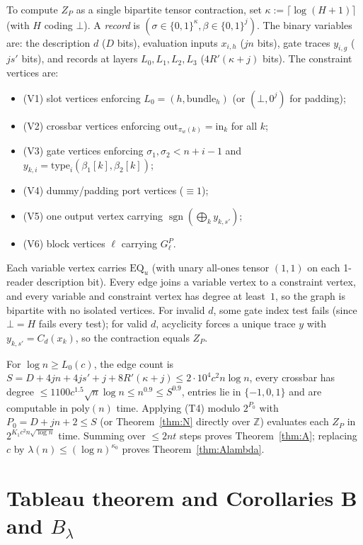 \documentclass[11pt]{article}
\theoremstyle{definition}
\begin{document}
To compute $Z_P$ as a single bipartite tensor contraction, set $\kappa:=\lceil\log(H+1)\rceil$ (with $H$ coding $\bot$). A \emph{record} is $(\sigma\in\{0,1\}^\kappa,\beta\in\{0,1\}^j)$. The binary variables are: the description $d$ ($D$ bits), evaluation inputs $x_{i,h}$ ($j n$ bits), gate traces $y_{i,g}$ ($j s'$ bits), and records at layers $L_0,L_1,L_2,L_3$ ($4R'(\kappa+j)$ bits). The constraint vertices are:
\begin{itemize}
\item (V1) slot vertices enforcing $L_0=(h,\mathrm{bundle}_h)$ (or $(\bot,0^j)$ for padding);
\item (V2) crossbar vertices enforcing $\mathrm{out}_{\pi_w(k)}=\mathrm{in}_k$ for all $k$;
\item (V3) gate vertices enforcing $\sigma_1,\sigma_2<n+i-1$ and $y_{k,i}=\mathrm{type}_i(\beta_1[k],\beta_2[k])$;
\item (V4) dummy/padding port vertices ($\equiv 1$);
\item (V5) one output vertex carrying $\operatorname{sgn}(\bigoplus_k y_{k,s'})$;
\item (V6) block vertices $\ell$ carrying $G_\ell^P$.
\end{itemize}
Each variable vertex carries $\mathrm{EQ}_u$ (with unary all-ones tensor $(1,1)$ on each 1-reader description bit). Every edge joins a variable vertex to a constraint vertex, and every variable and constraint vertex has degree at least~$1$, so the graph is bipartite with no isolated vertices. For invalid $d$, some gate index test fails (since $\bot=H$ fails every test); for valid $d$, acyclicity forces a unique trace $y$ with $y_{k,s'}=C_d(x_k)$, so the contraction equals $Z_P$.

For $\log n\ge L_0(c)$, the edge count is $S=D+4jn+4js'+j+8R'(\kappa+j)\le 2\cdot10^4 c^2 n\log n$, every crossbar has degree $\le 1100 c^{1.5}\sqrt{n}\log n\le n^{0.9}\le S^{0.9}$, entries lie in $\{-1,0,1\}$ and are computable in $\mathrm{poly}(n)$ time. Applying (T4) modulo $2^{P_0}$ with $P_0=D+jn+2\le S$ (or Theorem~\ref{thm:N} directly over $\mathbb{Z}$) evaluates each $Z_P$ in $2^{K_1 c^2 n\sqrt{\log n}}$ time. Summing over $\le 2nt$ steps proves Theorem~\ref{thm:A}; replacing $c$ by $\lambda(n)\le(\log n)^{\kappa_0}$ proves Theorem~\ref{thm:Alambda}.

\section{Tableau theorem and Corollaries B and $B_\lambda$}\label{sec:tableau}
\end{document}
